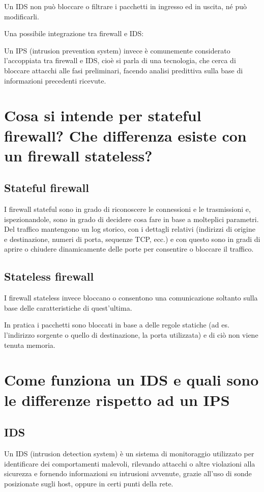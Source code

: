 \documentclass{report}
\begin{document}
\noindent Un IDS non può bloccare o filtrare i pacchetti in ingresso ed in uscita, né può modificarli.

\noindent Una possibile integrazione tra firewall e IDS:

\noindent Un IPS (intrusion prevention system) invece è comunemente considerato l’accoppiata tra firewall e IDS, cioè si parla di una tecnologia, che cerca di bloccare attacchi alle fasi 
preliminari, facendo analisi predittiva sulla base di informazioni precedenti ricevute.

\section{Cosa si intende per stateful firewall? Che differenza esiste con un firewall stateless?}
\subsection{Stateful firewall}
I firewall stateful sono in grado di riconoscere le connessioni e le trasmissioni e, ispezionandole, sono in grado di decidere cosa fare in base a molteplici parametri.
\noindent Del traffico mantengono un log storico, con i dettagli relativi (indirizzi di origine e destinazione, numeri di porta, sequenze TCP, ecc.) e con questo sono in gradi di 
aprire o chiudere dinamicamente delle porte per consentire o bloccare il traffico.

\subsection{Stateless firewall}
I firewall stateless invece bloccano o consentono una comunicazione soltanto sulla base delle caratteristiche di quest'ultima. 

\noindent In pratica i pacchetti sono bloccati in base a delle regole statiche (ad es. l'indirizzo sorgente o quello di destinazione, la porta utilizzata) e di ciò non viene tenuta memoria.

\section{Come funziona un IDS e quali sono le differenze rispetto ad un IPS}
\subsection{IDS}
Un IDS (intrusion detection system) è un sistema di monitoraggio utilizzato per identificare dei comportamenti malevoli, rilevando attacchi o altre violazioni alla sicurezza e 
fornendo informazioni su intrusioni avvenute, grazie all'uso di sonde posizionate sugli host, oppure in certi punti della rete.
\end{document}
